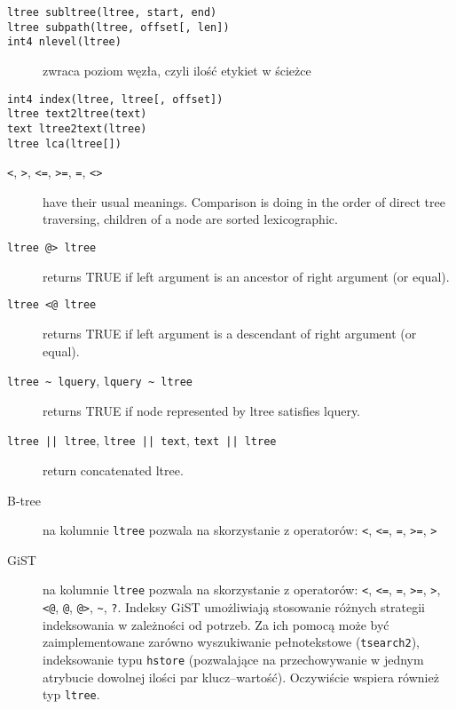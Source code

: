 \begin{description}
    \item[\texttt{ltree subltree(ltree, start, end)}] 
    \item[\texttt{ltree subpath(ltree, offset[, len])}] 
    \item[\texttt{int4 nlevel(ltree)}] 
        zwraca poziom węzła, czyli ilość etykiet w ścieżce
    \item[\texttt{int4 index(ltree, ltree[, offset])}] 
    \item[\texttt{ltree text2ltree(text)}] 
    \item[\texttt{text ltree2text(ltree)}] 
    \item[\texttt{ltree lca(ltree[])}] 
\end{description}

\begin{description}
    \item[\texttt{<}, \texttt{>}, \texttt{<=}, \texttt{>=}, \texttt{=}, \texttt{<>}]
        have their usual meanings. Comparison is doing in the order of direct tree traversing, children of a node are sorted lexicographic.
    \item[\texttt{ltree @> ltree}]
        returns TRUE if left argument is an ancestor of right argument (or equal).
    \item[\texttt{ltree <@ ltree}]
        returns TRUE if left argument is a descendant of right argument (or equal).
    \item[\texttt{ltree \~{} lquery}, \texttt{lquery \~{} ltree}]
        returns TRUE if node represented by ltree satisfies lquery.
    \item[\texttt{ltree || ltree}, \texttt{ltree || text}, \texttt{text || ltree}]
        return concatenated ltree.
\end{description}



\begin{description}
    \item[B-tree] na kolumnie \texttt{ltree} pozwala na skorzystanie z operatorów: \verb|<|, \verb|<=|, \verb|=|, \verb|>=|, \verb|>|
    \item[GiST] na kolumnie \texttt{ltree} pozwala na skorzystanie z operatorów: 
        \verb|<|, \verb|<=|, \verb|=|, \verb|>=|, \verb|>|, \verb|<@|, \verb|@|, \verb|@>|, \verb|~|, \verb|?|.
        Indeksy GiST  umożliwiają stosowanie różnych strategii indeksowania w zależności od potrzeb.
        Za ich pomocą może być zaimplementowane zarówno wyszukiwanie pełnotekstowe (\texttt{tsearch2}), 
        indeksowanie typu \texttt{hstore} (pozwalające na przechowywanie w jednym atrybucie dowolnej ilości par klucz--wartość).
        Oczywiście wspiera również typ \texttt{ltree}.
\end{description}

